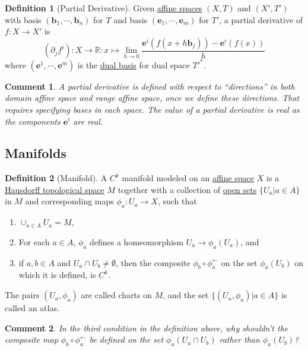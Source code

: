 \documentclass[letterpaper,12pt]{article}
\theoremstyle{plain}
\theoremstyle{plain}
\newtheorem*{cmnt*}{Comment}
\theoremstyle{definition}
\newtheorem{defn}{Definition}
\begin{document}
\begin{defn}[Partial Derivative]\label{defpderiv}
Given \hyperref[defafsp]{affine spaces} $(X,T)$ and $(X',T')$ with basis $(\mathbf{b}_1,\cdots,\mathbf{b}_n)$ for $T$ and basis $(\mathbf{e}_1,\cdots,\mathbf{e}_m)$ for $T'$, a partial derivative of 
$f:X\rightarrow X'$ is
\[ (\partial_jf^i):X\rightarrow \mathbb{R}:x\mapsto \lim_{h\to 0} \frac{\mathbf{e}^{i}(f(x+h\mathbf{b}_j))-\mathbf{e}^{i}(f(x))}{h}\]
where $(\mathbf{e}^1,\cdots,\mathbf{e}^m)$ is the \hyperref[defdbas]{dual basis} for dual space $T'^*$.
\end{defn}

\begin{cmnt*} A partial derivative is defined with respect to ``directions'' in both domain affine space and range affine space, once we define these directions. That requires specifying bases in each space. The value of a partial derivative is real as the components $\mathbf{e}^{i}$ are real.
\end{cmnt*}

\subsection{Manifolds}
\begin{defn}[Manifold]\label{defmfold}
A $C^k$ manifold modeled on an \hyperref[defafsp]{affine space} $X$ is a \hyperref[defhtop]{Hausdorff topological space} $M$ together with a collection of \hyperref[defoset]{open sets} $\{U_a|a\in A\}$ in $M$ and corresponding maps $\phi_a:U_a\rightarrow X$, such that
\begin{enumerate}
\item $\cup_{a\in A}U_a=M$,
\item For each $a\in A$, $\phi_a$ defines a homeomorphism $U_a\rightarrow \phi_a(U_a)$, and
\item if $a,b\in A$ and $U_a \cap U_b \neq \emptyset$, then the composite $\phi_b \circ \phi_a^{\leftarrow}$ on the set $\phi_a(U_b)$ on which it is defined, is $C^k$.
\end{enumerate}
The pairs $(U_a,\phi_a)$ are called charts on $M$, and the set $\{(U_a,\phi_a)|a\in A\}$ is called an atlas.
\end{defn}

\begin{cmnt*} In the third condition in the definition above, why shouldn't the composite map $\phi_b \circ \phi_a^{\leftarrow}$ be defined on the set $\phi_a(U_a \cap U_b)$ rather than $\phi_a(U_b)$?
\end{cmnt*}
\end{document}
